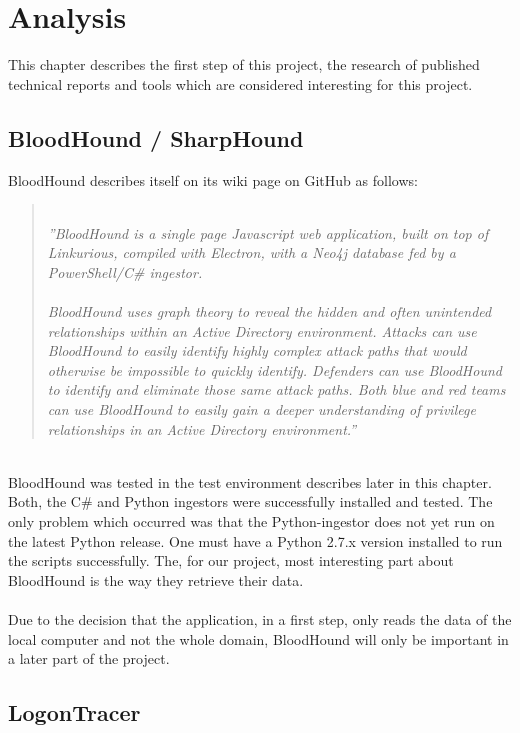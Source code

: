 \section{Analysis}
This chapter describes the first step of this project, the research of published technical reports and tools which are considered interesting for this project.
\subsection{BloodHound / SharpHound}
BloodHound describes itself on its wiki page on GitHub as follows:
\begin{quotation} \ \\
\textit{''BloodHound is a single page Javascript web application, built on top of Linkurious, compiled with Electron, with a Neo4j database fed by a PowerShell/C\# ingestor. \\
\ \\
BloodHound uses graph theory to reveal the hidden and often unintended relationships within an Active Directory environment. Attacks can use BloodHound to easily identify highly complex attack paths that would otherwise be impossible to quickly identify. Defenders can use BloodHound to identify and eliminate those same attack paths. Both blue and red teams can use BloodHound to easily gain a deeper understanding of privilege relationships in an Active Directory environment.''} 
\cite{blo2018}
\end{quotation}
\ \\
BloodHound was tested in the test environment describes later in this chapter. Both, the C\# and Python ingestors were successfully installed and tested. The only problem which occurred was that the Python-ingestor does not yet run on the latest Python release. One must have a Python 2.7.x version installed to run the scripts successfully.
The, for our project, most interesting part about BloodHound is the way they retrieve their data. \ \\
\ \\
Due to the decision that the application, in a first step, only reads the data of the local computer and not the whole domain, BloodHound will only be important in a later part of the project.

\subsection{LogonTracer}

